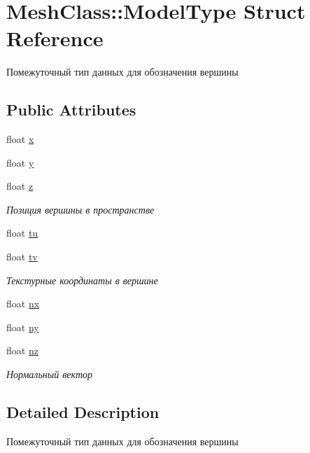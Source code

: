\hypertarget{struct_mesh_class_1_1_model_type}{}\section{Mesh\+Class\+:\+:Model\+Type Struct Reference}
\label{struct_mesh_class_1_1_model_type}


Помежуточный тип данных для обозначения вершины  


\subsection*{Public Attributes}
\begin{DoxyCompactItemize}
\item 
float \hyperlink{struct_mesh_class_1_1_model_type_aca6fc08b4a40b0f6482521281e8f50da}{x}
\item 
float \hyperlink{struct_mesh_class_1_1_model_type_a1fc8b151d09be24d5189e82eebb65169}{y}
\item 
float \hyperlink{struct_mesh_class_1_1_model_type_aa64be21a1d4a0ad3fbf859a1be235a7e}{z}
\begin{DoxyCompactList}\small\item\em Позиция вершины в пространстве \end{DoxyCompactList}\item 
float \hyperlink{struct_mesh_class_1_1_model_type_a2f6e95b9dc198a9bf603c91a5c7d5517}{tu}
\item 
float \hyperlink{struct_mesh_class_1_1_model_type_a41de313f7f252c54c1e9759aff234021}{tv}
\begin{DoxyCompactList}\small\item\em Текстурные координаты в вершине \end{DoxyCompactList}\item 
float \hyperlink{struct_mesh_class_1_1_model_type_a714c4ce69ca0e00ae3f5ab5058a844bd}{nx}
\item 
float \hyperlink{struct_mesh_class_1_1_model_type_a6ff7cd4bc735cd7d40aabec1e4fcc24e}{ny}
\item 
float \hyperlink{struct_mesh_class_1_1_model_type_ad593cb3f2b6ba5522a049df7599c9eed}{nz}
\begin{DoxyCompactList}\small\item\em Нормальный вектор \end{DoxyCompactList}\end{DoxyCompactItemize}


\subsection{Detailed Description}
Помежуточный тип данных для обозначения вершины 

